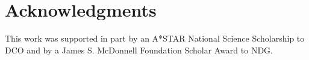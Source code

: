 \documentclass[10pt,letterpaper]{article}
\begin{document}
\section{Acknowledgments}

This work was supported in part by an A*STAR National Science Scholarship to DCO and by a James S. McDonnell Foundation Scholar Award to NDG.




\setlength{\bibleftmargin}{.125in}
\setlength{\bibindent}{-\bibleftmargin}





%
%
%
%
\end{document}
